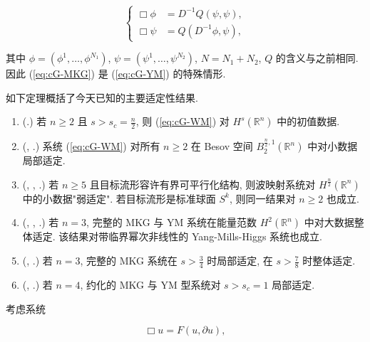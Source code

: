 
\begin{equation}
\left\{ \begin{aligned} \Box \phi &= D ^ {- 1} Q (\psi ,  \psi),  \\ \Box \psi &= Q (D ^ {- 1} \phi ,  \psi),  \end{aligned} \right.\tag{MKG}\label{eq:cG-MKG}
\end{equation}

其中 $\phi = (\phi^1,  \ldots,  \phi^{N_1})$, $\psi = (\psi^1,  \ldots,  \psi^{N_2})$, $N = N_1 + N_2$, $Q$ 的含义与之前相同. 因此 (\ref{eq:cG-MKG}) 是 (\ref{eq:cG-YM}) 的特殊情形. 

如下定理概括了今天已知的主要适定性结果. 


\begin{enumerate}
\def\labelenumi{\roman{enumi}.}
\item (\cite{gfref35, gfref44}.) 若 $n \geq 2$ 且 $s > s_c = \frac{n}{2}$, 则 (\ref{eq:cG-WM}) 对 $H^s(\mathbb{R}^n)$ 中的初值数据. 
\item (\cite{gfref72},  \cite{gfref73}.) 系统 (\ref{eq:cG-WM}) 对所有 $n \geq 2$ 在 Besov 空间 $B_2^{\frac{n}{2}, 1}(\mathbb{R}^n)$ 中对小数据局部适定. 
\item (\cite{gfref70},  \cite{gfref41},  \cite{gfref71}.) 若 $n \geq 5$ 且目标流形容许有界可平行化结构, 则波映射系统对 $H^{\frac{n}{2}}(\mathbb{R}^{n})$ 中的小数据"弱适定". 若目标流形是标准球面 $S^{k}$, 则同一结果对 $n \geq 2$ 也成立. 
\item (\cite{gfref33},  \cite{gfref34},  \cite{gfref19}.) 若 $n = 3$, 完整的 MKG 与 YM 系统在能量范数 $H^2(\mathbb{R}^n)$ 中对大数据整体适定. 该结果对带临界幂次非线性的 Yang-Mills-Higgs 系统也成立. 
\item (\cite{gfref13},  \cite{gfref21}.) 若 $n = 3$, 完整的 MKG 系统在 $s > \frac{3}{4}$ 时局部适定, 在 $s > \frac{7}{8}$ 时整体适定. 
\item (\cite{gfref39},  \cite{gfref47}.) 若 $n = 4$, 约化的 MKG 与 YM 型系统对 $s > s_c = 1$ 局部适定. 
\end{enumerate}


考虑系统

\begin{equation}
\Box u = F (u,  \partial u), \label{eq:cG-22}
\end{equation}

